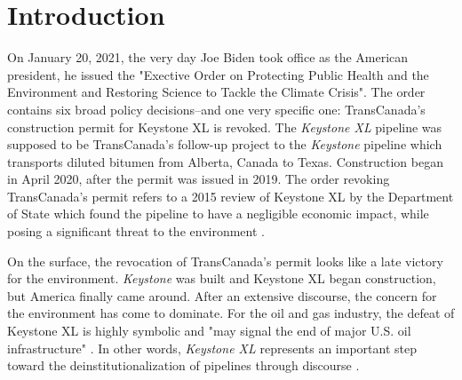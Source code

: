 
\section*{Introduction}




On January 20, 2021, the very day Joe Biden took office as the American president, he issued the "Exective Order on Protecting Public Health and the Environment and Restoring Science to Tackle the Climate Crisis". 
The order contains six broad policy decisions--and one very specific one: TransCanada's construction permit for Keystone XL is revoked. The \textit{Keystone XL} pipeline was supposed to be TransCanada's follow-up project to the \textit{Keystone} pipeline which transports diluted bitumen from Alberta, Canada to Texas. Construction began in April 2020, after the permit was issued in 2019. The order revoking TransCanada's permit refers to a 2015 review of Keystone XL by the Department of State which found the pipeline to have a negligible economic impact, while posing a significant threat to the environment \citep{DoS2015}.

On the surface, the revocation of TransCanada's permit looks like a late victory for the environment. \textit{Keystone} was built and Keystone XL began construction, but America finally came around. After an extensive discourse, the concern for the environment has come to dominate. For the oil and gas industry, the defeat of Keystone XL is highly symbolic and "may signal the end of major U.S. oil infrastructure" \citep{Freitas2021}. 
In other words, \textit{Keystone XL} represents an important step toward the deinstitutionalization of pipelines through discourse \citep[cf.][]{Maguire2009}. 

